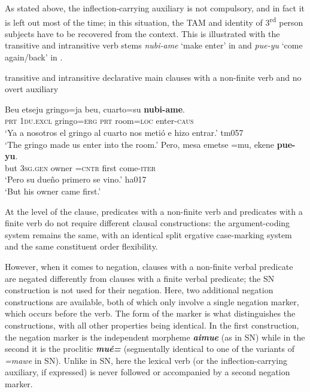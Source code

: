 \documentclass[output=paper]{langsci/langscibook}
\begin{document}
As stated above, the inflection-carrying auxiliary is not compulsory, and
in fact it is left out most of the time; in this situation, the TAM and
identity of 3\textsuperscript{rd} person subjects have to be recovered from
the context. This is illustrated with the transitive and intransitive verb
stems \textit{nubi-ame} `make enter' in  and
\textit{pue-yu} `come again\slash back' in
.

\begin{exe}\ex \label{ex:tacana-infinite-gringo-owner}  transitive and intransitive declarative main clauses with a non-finite verb and no overt auxiliary
\begin{xlist}
\ex\label{ex:tacana-infinite-gringo}
\gll  Beu  etseju
gringo=ja  beu,  cuarto=su
\textbf{nubi-ame}.
\\
    \textsc{prt} \textsc{1du.excl} gringo=\textsc{erg} \textsc{prt}
    room=\textsc{loc}  enter-\textsc{caus}\\
\glt `Ya a nosotros el gringo al cuarto nos metió e hizo entrar.' tm057\\
`The gringo made us enter into the room.'
\ex\label{ex:tacana-infinite-owner}
\gll Pero, mesa
emetse{\cb} =mu, ekene
\textbf{pue-yu}.\\
    but  \textsc{3sg.gen}  owner  =\textsc{cntr}  first
    come-\textsc{iter}\\
\glt `Pero su dueño primero se vino.' ha017\\
`But his owner came first.'
\end{xlist}\end{exe}

At the level of the clause, predicates with a non-finite verb and predicates with a finite verb do not require different clausal constructions: the argument-coding system remains the same, with an identical split ergative case-marking system and the same constituent order flexibility.

However, when it comes to negation, clauses with a non-finite verbal
predicate are negated differently from clauses with a finite verbal
predicate; the SN construction is not used for their negation. Here, two
additional negation constructions are available, both of which only involve
a single negation marker, which occurs before the verb. The form of the
marker is what distinguishes the constructions, with all other properties
being identical. In the first construction, the negation marker is the
independent morpheme \textbf{\textit{aimue}} (as in SN) while in the
second it is the proclitic \textbf{\textit{mué=}} (segmentally identical
to one of the variants of \textit{=mawe} in SN). Unlike in SN, here the
lexical verb (or the inflection-carrying auxiliary, if expressed) is never
followed or accompanied by a second negation marker.
\end{document}
